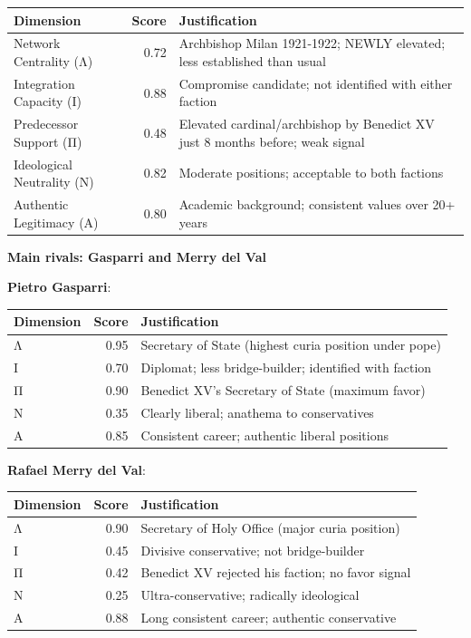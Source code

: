 \begin{center}
\begin{tabular}{lrp{4cm}}
\toprule
\textbf{Dimension} & \textbf{Score} & \textbf{Justification} \\
\midrule
Network Centrality (Λ) & 0.72 & Archbishop Milan 1921-1922; NEWLY elevated; less established than usual \\
Integration Capacity (Ι) & 0.88 & Compromise candidate; not identified with either faction \\
Predecessor Support (Π) & 0.48 & Elevated cardinal/archbishop by Benedict XV just 8 months before; weak signal \\
Ideological Neutrality (Ν) & 0.82 & Moderate positions; acceptable to both factions \\
Authentic Legitimacy (Α) & 0.80 & Academic background; consistent values over 20+ years \\
\bottomrule
\end{tabular}
\end{center}

\textbf{Main rivals: Gasparri and Merry del Val}

\textbf{Pietro Gasparri}:
\begin{center}
\begin{tabular}{lrp{4cm}}
\toprule
\textbf{Dimension} & \textbf{Score} & \textbf{Justification} \\
\midrule
Λ & 0.95 & Secretary of State (highest curia position under pope) \\
Ι & 0.70 & Diplomat; less bridge-builder; identified with faction \\
Π & 0.90 & Benedict XV's Secretary of State (maximum favor) \\
Ν & 0.35 & Clearly liberal; anathema to conservatives \\
Α & 0.85 & Consistent career; authentic liberal positions \\
\bottomrule
\end{tabular}
\end{center}

\textbf{Rafael Merry del Val}:
\begin{center}
\begin{tabular}{lrp{4cm}}
\toprule
\textbf{Dimension} & \textbf{Score} & \textbf{Justification} \\
\midrule
Λ & 0.90 & Secretary of Holy Office (major curia position) \\
Ι & 0.45 & Divisive conservative; not bridge-builder \\
Π & 0.42 & Benedict XV rejected his faction; no favor signal \\
Ν & 0.25 & Ultra-conservative; radically ideological \\
Α & 0.88 & Long consistent career; authentic conservative \\
\bottomrule
\end{tabular}
\end{center}

